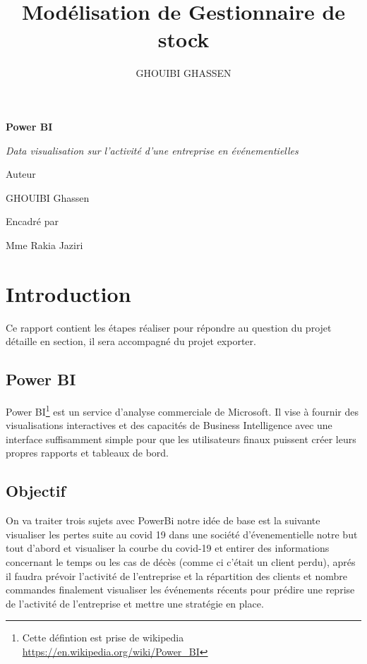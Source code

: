\documentclass[french,a4paper,11pt,oneside]{book}
\author{\color{blue} \raggedright GHOUIBI GHASSEN}
\title{\color{red} \normalfont\huge Modélisation de Gestionnaire de stock}
\begin{document}
 \begin{titlepage}
  \centering 

  \vspace{1cm}

  \vspace{0.5cm}
  {\huge\bfseries Power BI\par}
  \vspace{0.5cm}
  \vfill
  {\Large\itshape \color{googlegreen} Data visualisation sur l'activité d'une entreprise en événementielles\par}
  \vfill
  {\large Auteur \par
  GHOUIBI Ghassen\textsc{}\par}
  \vspace{1cm}
  {\large Encadré par \par
 Mme Rakia Jaziri\textsc{}\par
 
  }
 \end{titlepage}
	\tableofcontents
	
	\newpage
	\section{Introduction}{
		Ce rapport contient les étapes réaliser pour répondre au question du projet détaille en section, il sera accompagné du projet exporter.\\
		\subsection{Power BI}{
		Power BI\footnote{Cette défintion est prise de wikipedia \url{https://en.wikipedia.org/wiki/Power_BI}} est un service d'analyse commerciale de Microsoft. Il vise à fournir des visualisations interactives et des capacités de Business Intelligence avec une interface suffisamment simple pour que les utilisateurs finaux puissent créer leurs propres rapports et tableaux de bord.	
		}
		\subsection{Objectif}{
			On va traiter trois sujets avec PowerBi notre idée de base est la suivante visualiser les pertes suite au covid 19 dans une société d'évenementielle notre but tout d'abord et visualiser la courbe du covid-19 et entirer des informations concernant le temps ou les cas de décès (comme ci c'était un client perdu), aprés il faudra prévoir l'activité de l'entreprise et la répartition des clients et nombre commandes finalement visualiser les événements récents pour prédire une reprise de l'activité de l'entreprise et mettre une stratégie en place.
		}
	
	}
	 \newpage
\end{document}
